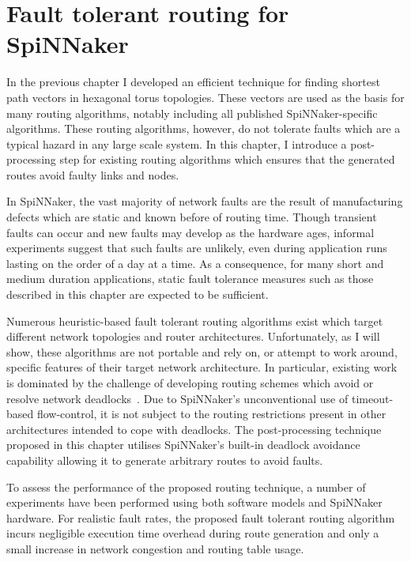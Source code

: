 \chapter{Fault tolerant routing for SpiNNaker}
	
	\label{sec:routing}
	
	In the previous chapter I developed an efficient technique for finding
	shortest path vectors in hexagonal torus topologies. These vectors are used
	as the basis for many routing algorithms, notably including all published
	SpiNNaker-specific algorithms. These routing algorithms, however, do not
	tolerate faults which are a typical hazard in any large scale system. In this
	chapter, I introduce a post-processing step for existing routing algorithms
	which ensures that the generated routes avoid faulty links and nodes.
	
	In SpiNNaker, the vast majority of network faults are the result of
	manufacturing defects which are static and known before of routing time.
	Though transient faults can occur and new faults may develop as the hardware
	ages, informal experiments suggest that such faults are unlikely, even during
	application runs lasting on the order of a day at a time. As a consequence,
	for many short and medium duration applications, static fault tolerance
	measures such as those described in this chapter are expected to be
	sufficient.
	
	Numerous heuristic-based fault tolerant routing algorithms exist which target
	different network topologies and router architectures. Unfortunately, as I
	will show, these algorithms are not portable and rely on, or attempt to work
	around, specific features of their target network architecture. In
	particular, existing work is dominated by the challenge of developing routing
	schemes which avoid or resolve network deadlocks~\cite[chapter~14]{dally04}.
	Due to SpiNNaker's unconventional use of timeout-based flow-control, it is
	not subject to the routing restrictions present in other architectures
	intended to cope with deadlocks. The post-processing technique proposed in
	this chapter utilises SpiNNaker's built-in deadlock avoidance capability
	allowing it to generate arbitrary routes to avoid faults.
	
	To assess the performance of the proposed routing technique, a number of
	experiments have been performed using both software models and SpiNNaker
	hardware. For realistic fault rates, the proposed fault tolerant routing
	algorithm incurs negligible execution time overhead during route generation
	and only a small increase in network congestion and routing table usage.
	
